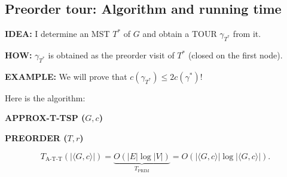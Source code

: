 \subsection{Preorder tour: Algorithm and running time}
\textbf{IDEA:} I determine an MST $T^*$ of $G$ and obtain a TOUR $\gamma_{T^*}$ from it.

\textbf{HOW:} $\gamma_{T^*}$ is obtained as the preorder visit of $T^*$ (closed on the first node).

\textbf{EXAMPLE:}
We will prove that $c(\gamma_{T^*})\leq2c(\gamma^*)$!

Here is the algorithm:
\begin{notesalgorithm}
\textbf{APPROX-T-TSP ($G,c$)}
\begin{notespseudocode}
\end{notespseudocode}
\end{notesalgorithm}
\begin{notesalgorithm}
\textbf{PREORDER ($T,r$)}
\begin{notespseudocode}
\end{notespseudocode}
\end{notesalgorithm}
\[T_{\mathrm{A\text{-}T\text{-}T}}(|\langle G,c\rangle|)=\underbrace{O(|E|\log|V|)}_{T_{\mathrm{PRIM}}}=O(|\langle G,c\rangle|\log|\langle G,c\rangle|).\]
